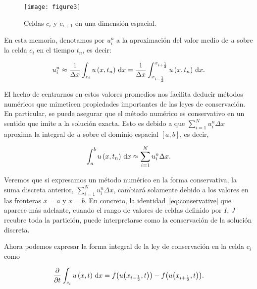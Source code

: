 \begin{figure}[ht!]
  \centering
  \texttt{[image: figure3]}
  \caption{Celdas $c_{i}$ y $c_{i+1}$ en una dimensión espacial.}
  \label{fig:cellsunidimensional}
\end{figure}

En esta memoria, denotamos por $u^{n}_{i}$ a la aproximación del
valor medio de $u$ sobre la celda $c_{i}$ en el tiempo $t_{n}$, es
decir:

\begin{equation*}
  u^{n}_{i}\approx
  \frac{1}{\Delta x}
  \int_{c_{i}}
  u
  \left(x,t_{n}\right)
  \dl x=
  \frac{1}{\Delta x}
  \int_{x_{i-\frac{1}{2}}}^{x_{i+\frac{1}{2}}}
  u
  \left(x,t_{n}\right)
  \dl x.
\end{equation*}

El hecho de centrarnos en estos valores promedios nos facilita
deducir métodos numéricos que mimeticen propiedades importantes de
las leyes de conservación.
En particular, se puede asegurar que el método numérico es
conservativo en un sentido que imite a la solución exacta.
Esto es debido a que
\begin{math}
  \sum_{i=1}^{N}
  u^{n}_{i}
  \Delta x
\end{math}
aproxima la integral de $u$ sobre el dominio espacial
$\left[a,b\right]$, es decir,

\begin{equation*}
  \int_{a}^{b}
  u
  \left(x,t_{n}\right)
  \dl x\approx
  \sum_{i=1}^{N}
  u^{n}_{i}
  \Delta x.
\end{equation*}

Veremos que si expresamos un método numérico en la forma
conservativa, la suma discreta anterior,
\begin{math}
  \sum_{i=1}^{N}
  u^{n}_{i}
  \Delta x
\end{math},
cambiará solamente debido a
los valores en las fronteras $x=a$ y $x=b$.
En concreto, la identidad~\eqref{eq:conservative} que aparece más
adelante, cuando el rango de valores de celdas definido por $I$, $J$
recubre toda la partición, puede interpretarse como la conservación
de la solución discreta.

Ahora podemos expresar la forma integral de la ley de conservación en
la celda $c_{i}$ como

\begin{equation}\label{eq:integralformcell}
  \diffp{}{t}
  \int_{c_{i}}
  u\left(x,t\right)
  \dl x=
  f
  \big(
  u\big(x_{i-\frac{1}{2}},t\big)
  \big)-
  f
  \big(
  u\big(x_{i+\frac{1}{2}},t\big)
  \big).
\end{equation}

